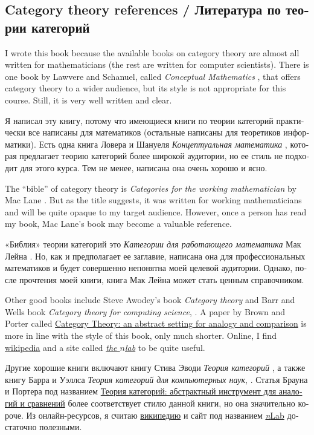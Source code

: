 \documentclass[a4paper]{book}
\theoremstyle{myth}
\begin{document}
\begin{russian}

\section{Category theory references / Литература по теории категорий}

I wrote this book because the available books on category theory are almost all written for mathematicians (the rest are written for computer scientists). There is one book by Lawvere and Schanuel, called {\em Conceptual Mathematics} \cite{LS}, that offers category theory to a wider audience, but its style is not appropriate for this course. Still, it is very well written and clear.

Я написал эту книгу, потому что имеющиеся книги по теории категорий практически все написаны для математиков (остальные написаны для теоретиков информатики). Есть одна книга Ловера и Шануеля {\em Концептуальная математика} \cite{LS}, которая предлагает теорию категорий более широкой аудитории, но ее стиль не подходит для этого курса. Тем не менее, написана она очень хорошо и ясно. 

The “bible” of category theory is {\em Categories for the working mathematician} by Mac Lane \cite{Mac}. But as the title suggests, it was written for working mathematicians and will be quite opaque to my target audience. However, once a person has read my book, Mac Lane's book may become a valuable reference.

«Библия» теории категорий это {\em Категории для работающего математика} Мак Лейна \cite{Mac}. Но, как и предполагает ее заглавие, написана она для профессиональных математиков и будет совершенно непонятна моей целевой аудитории. Однако, после прочтения моей книги, книга Мак Лейна может стать ценным справочником.  

Other good books include Steve Awodey's book {\em Category theory} \cite{Awo} and Barr and Wells book {\em Category theory for computing science}, \cite{BW}.  A paper by Brown and Porter called  \href{http://pages.bangor.ac.uk/\%7Emas010/pdffiles/Analogy-and-Comparison.pdf}{\text Category Theory: an abstract setting for analogy and comparison} \cite{BP1} is more in line with the style of this book, only much shorter. Online, I find \href{http://www.wikipedia.org}{\text wikipedia} and a site called \href{http://ncatlab.org/nlab/show/HomePage}{\em the $n$lab} to be quite useful.

Другие хорошие книги включают книгу Стива Эводи {\em Теория категорий} \cite{Awo}, а также книгу Барра и Уэллса {\em Теория категорий для компьютерных наук}, \cite{BW}. Статья Брауна и Портера под названием  \href{http://pages.bangor.ac.uk/\%7Emas010/pdffiles/Analogy-and-Comparison.pdf}{\text Теория категорий: абстрактный инструмент для аналогий и сравнений} \cite{BP1} более соответствует стилю данной книги, но она значительно короче. Из онлайн-ресурсов, я считаю \href{http://www.wikipedia.org}{\text википедию} и сайт под названием \href{http://ncatlab.org/nlab/show/HomePage}{{\em{n}}Lab} достаточно полезными. 


\end{russian}
\end{document}
